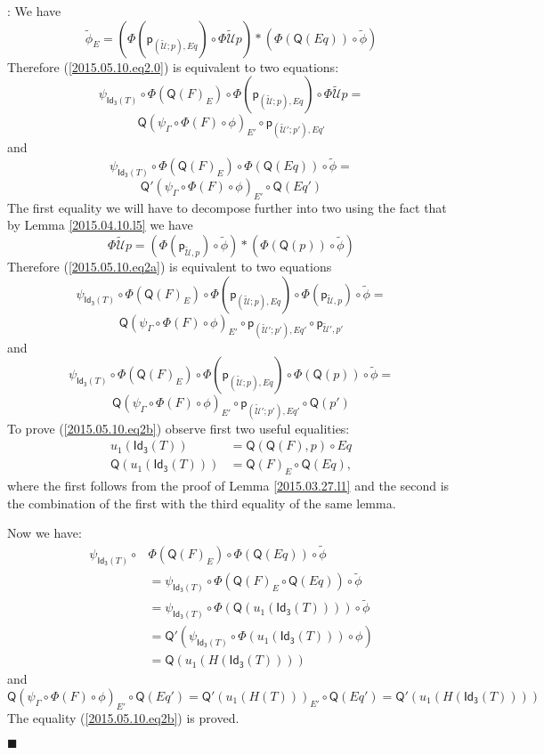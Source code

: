 \documentclass[12pt]{article}
\numberwithin{equation}{section}
\newenvironment{eq}{\begin{equation}}{\end{equation}}
\newenvironment{myproof}{{\bf Proof}:}{$\blacksquare$ \vskip 5mm }
\newcommand{\llabel}[1]{\label{#1}}
\newcommand{\wt}{\widetilde}
\newcommand{\p}{\mathsf{p}}
\newcommand{\Idx}{\mathsf{Id_3}} %
\newcommand{\U}{\mathcal{U}}
\newcommand{\Q}{\mathsf{Q}}
\begin{document}
\begin{myproof}
We have
%
$$\wt{\phi}_E=(\Phi(\p_{(\wt{\U};p),Eq})\circ
\Phi\wt{\U}p)*(\Phi(\Q(Eq))\circ\wt{\phi})$$
%
Therefore (\ref{2015.05.10.eq2.0}) is equivalent to two equations:
%
$$\psi_{\Idx(T)}\circ \Phi(\Q(F)_E)\circ \Phi(\p_{(\wt{\U};p),Eq})\circ
\Phi\wt{\U}p=$$
\begin{eq}
\label{2015.05.10.eq2a}
\Q(\psi_{\Gamma}\circ \Phi(F)\circ \phi)_{E'}\circ \p_{(\wt{\U}';p'),Eq'}
\end{eq}%
%
and
%
$$\psi_{\Idx(T)}\circ \Phi(\Q(F)_E)\circ \Phi(\Q(Eq))\circ\wt{\phi}=$$
\begin{eq}
\label{2015.05.10.eq2b}
\Q'(\psi_{\Gamma}\circ \Phi(F)\circ \phi)_{E'}\circ \Q(Eq')
\end{eq}%
%
The first equality we will have to decompose further into two using the fact
that by Lemma \ref{2015.04.10.l5} we have
%
$$\Phi\wt{\U}p=(\Phi(\p_{\wt{\U},p})\circ\wt{\phi})*(\Phi(\Q(p))\circ \wt{\phi})$$
%
Therefore (\ref{2015.05.10.eq2a}) is equivalent to two equations
%
$$\psi_{\Idx(T)}\circ \Phi(\Q(F)_E)\circ \Phi(\p_{(\wt{\U};p),Eq})\circ
\Phi(\p_{\wt{\U},p})\circ\wt{\phi}=$$
\begin{eq}
\llabel{2015.05.10.eq2aa} \Q(\psi_{\Gamma}\circ \Phi(F)\circ \phi)_{E'}\circ
\p_{(\wt{\U}';p'),Eq'}\circ \p_{\wt{\U}',p'}
\end{eq}%
%
and
%
$$\psi_{\Idx(T)}\circ \Phi(\Q(F)_E)\circ \Phi(\p_{(\wt{\U};p),Eq})\circ
\Phi(\Q(p))\circ\wt{\phi}=$$
\begin{eq}
\llabel{2015.05.10.eq2ab} \Q(\psi_{\Gamma}\circ \Phi(F)\circ \phi)_{E'}\circ
\p_{(\wt{\U}';p'),Eq'}\circ \Q(p')
\end{eq}%
%
To prove (\ref{2015.05.10.eq2b}) observe first two useful equalities:
%
\begin{align*}
  u_1(\Idx(T))&=\Q(\Q(F),p)\circ Eq \\
  \Q(u_1(\Idx(T)))&=\Q(F)_{E}\circ \Q(Eq),
\end{align*}
%
where the first follows from the proof of Lemma \ref{2015.03.27.l1} and the
second is the combination of the first with the third equality of the same
lemma.

Now we have:
%
\begin{align*}
  \psi_{\Idx(T)}\circ & \Phi(\Q(F)_E)\circ \Phi(\Q(Eq))\circ\wt{\phi} \\
    & = \psi_{\Idx(T)}\circ \Phi(\Q(F)_E\circ \Q(Eq))\circ\wt{\phi} \\
    & = \psi_{\Idx(T)}\circ \Phi(\Q(u_1(\Idx(T))))\circ \wt{\phi} \\
    & = \Q'(\psi_{\Idx(T)}\circ \Phi(u_1(\Idx(T)))\circ \phi) \\
    & = \Q(u_1(H(\Idx(T))))
\end{align*}
%
and
%
$$\Q(\psi_{\Gamma}\circ \Phi(F)\circ \phi)_{E'}\circ
\Q(Eq')=\Q'(u_1(H(T)))_{E'}\circ \Q(Eq')=\Q'(u_1(H(\Idx(T))))$$
%
The equality (\ref{2015.05.10.eq2b}) is proved.


\end{myproof}
\end{document}
